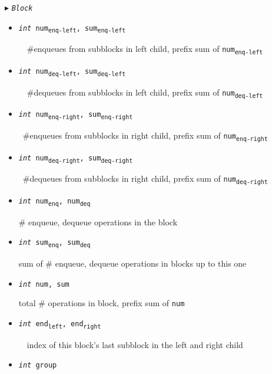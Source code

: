 \documentclass[10pt]{article}
\theoremstyle{definition}
\begin{document}
\begin{algorithm}
\begin{algorithmic}[1]
\begin{multicols}{2}
\Statex $\blacktriangleright$ \texttt{\textsl{Block}}

\begin{itemize}
  \item \texttt{\textsl{int} num\textsubscript{enq-left}, sum\textsubscript{enq-left}}
  
  \textsf{~~\#enqueues from subblocks in left child, prefix sum of \texttt{num\textsubscript{enq-left}}}

  \item \texttt{\textsl{int} num\textsubscript{deq-left}, sum\textsubscript{deq-left}}
  
  \textsf{~~\#dequeues from subblocks in left child, prefix sum of \texttt{num\textsubscript{deq-left}}}


  \item \texttt{\textsl{int} num\textsubscript{enq-right}, \texttt{sum\textsubscript{enq-right}}}
  
  \textsf{~\#enqueues from subblocks in right child, prefix sum of \texttt{num\textsubscript{enq-right}}}
  
  \item \texttt{\textsl{int} num\textsubscript{deq-right}, \texttt{sum\textsubscript{deq-right}}}
  
  \textsf{~\#dequeues from subblocks in right child, prefix sum of \texttt{num\textsubscript{deq-right}}}

  
  \item \texttt{\textsl{int} num\textsubscript{enq}, num\textsubscript{deq}}
  
  \textsf{\# enqueue, dequeue operations in the block}

  \item \texttt{\textsl{int} sum\textsubscript{enq}, sum\textsubscript{deq}}
  
  \textsf{sum of \# enqueue, dequeue operations in blocks up to this one}
  
  \item \texttt{\textsl{int} num, sum}
  
  \textsf{total \# operations in block, prefix sum of \texttt{num}}
  
  \item \texttt{\textsl{int} end\textsubscript{left}, end\textsubscript{right}}
  
  \textsf{~~index of this block's last subblock in the left and right child}
  \item \texttt{\textsl{int} group}

\end{itemize}


\end{multicols}
\end{algorithmic}
\end{algorithm}
\end{document}
